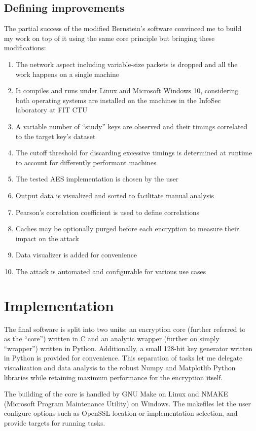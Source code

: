 \documentclass[thesis=B,english]{FITthesis}[2019/03/06]
\begin{document}
\section{Defining improvements}
\label{section:designlist}
The partial success of the modified Bernstein's software convinced me to build my work on top of it using the same core principle but bringing these modifications:
\begin{enumerate}
	\item The network aspect including variable-size packets is dropped and all the work happens on a single machine
	\item It compiles and runs under Linux and Microsoft Windows 10, considering both operating systems are installed on the machines in the InfoSec laboratory at FIT CTU
	\item A variable number of ``study'' keys are observed and their timings correlated to the target key's dataset
	\item The cutoff threshold for discarding excessive timings is determined at runtime to account for differently performant machines
	\item The tested AES implementation is chosen by the user
	\item Output data is visualized and sorted to facilitate manual analysis
	\item Pearson's correlation coefficient is used to define correlations
	\item Caches may be optionally purged before each encryption to measure their impact on the attack
	\item Data visualizer is added for convenience
	\item The attack is automated and configurable for various use cases
\end{enumerate}

\chapter{Implementation}
The final software is split into two units: an encryption core (further referred to as the ``core'') written in C and an analytic wrapper (further on simply ``wrapper'') written in Python.
Additionally, a small 128-bit key generator written in Python is provided for convenience.
This separation of tasks let me delegate visualization and data analysis to the robust Numpy and Matplotlib Python libraries while retaining maximum performance for the encryption itself.

The building of the core is handled by GNU Make on Linux and NMAKE (Microsoft Program Maintenance Utility) on Windows.
The makefiles let the user configure options such as OpenSSL location or implementation selection, and provide targets for running tasks.
\end{document}
